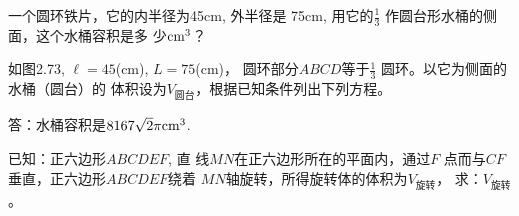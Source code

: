 \begin{example}
    一个圆环铁片，它的内半径为45cm, 外半径是
75cm, 用它的$\frac{1}{3}$
作圆台形水桶的侧面，这个水桶容积是多
少${\rm cm^3}$？
\end{example}

\begin{figure}[htp]
    \centering
\begin{tikzpicture}

    
\end{tikzpicture}
    \caption{}
\end{figure}

\begin{solution}
    如图2.73, $\ell=45$(cm), $L=75$(cm)，
圆环部分$ABCD$等于$\frac{1}{3}$
圆环。以它为侧面的水桶（圆台）的
体积设为$V_{\text{圆台}}$，根据已知条件列出下列方程。





















答：水桶容积是$8167\sqrt{2}\pi {\rm cm^3}$.
\end{solution}


\begin{example}
    已知：正六边形$ABCDEF$, 直
线$MN$在正六边形所在的平面内，通过$F$
点而与$CF$垂直，正六边形$ABCDEF$绕着
$MN$轴旋转，所得旋转体的体积为$V_{\text{旋转}}$，
求：$V_{\text{旋转}}$。
\end{example}


\begin{figure}[htp]
    \centering
{}
    \caption{}
\end{figure}

